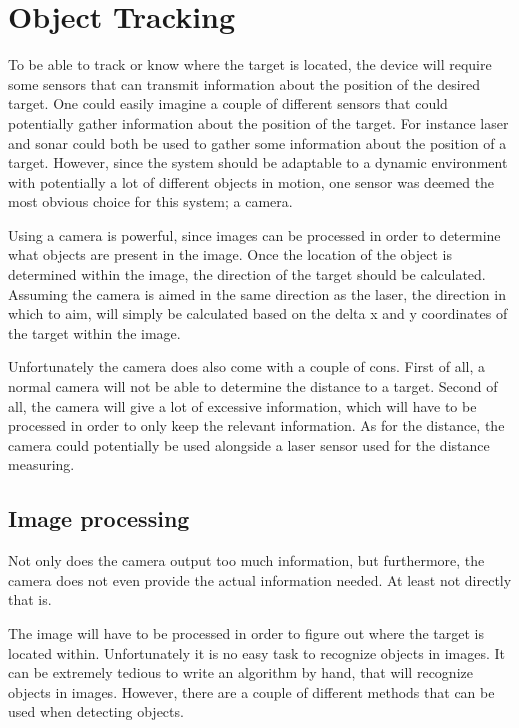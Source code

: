 \section{Object Tracking}

To be able to track or know where the target is located, the device will require some sensors that can transmit information about the position of the desired target.
One could easily imagine a couple of different sensors that could potentially gather information about the position of the target.
For instance laser and sonar could both be used to gather some information about the position of a target\cite{Sensors}.
However, since the system should be adaptable to a dynamic environment with potentially a lot of different objects in motion, one sensor was deemed the most obvious choice for this system; a camera.

Using a camera is powerful, since images can be processed in order to determine what objects are present in the image.
Once the location of the object is determined within the image, the direction of the target should be calculated.
Assuming the camera is aimed in the same direction as the laser, the direction in which to aim, will simply be calculated based on the delta x and y coordinates of the target within the image.

Unfortunately the camera does also come with a couple of cons.
First of all, a normal camera will not be able to determine the distance to a target.
Second of all, the camera will give a lot of excessive information, which will have to be processed in order to only keep the relevant information.
As for the distance, the camera could potentially be used alongside a laser sensor used for the distance measuring\cite{Sensors}.

\subsection{Image processing}
Not only does the camera output too much information, but furthermore, the camera does not even provide the actual information needed.
At least not directly that is.

The image will have to be processed in order to figure out where the target is located within.
Unfortunately it is no easy task to recognize objects in images.
It can be extremely tedious to write an algorithm by hand, that will recognize objects in images.
However, there are a couple of different methods that can be used when detecting objects.

